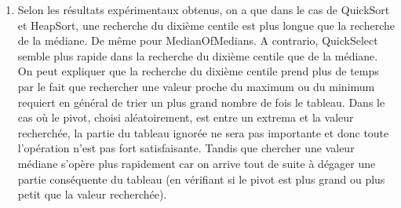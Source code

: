 \documentclass[a4paper, 11pt]{article}
\begin{document}
\begin{enumerate}
\begin{enumerate}
    \item
    \qquad Selon les résultats expérimentaux obtenus, on a que dans le cas de QuickSort et HeapSort, une recherche du dixième centile est plus longue que la recherche de la médiane. De même pour MedianOfMedians. A contrario, QuickSelect semble plus rapide dans la recherche du dixième centile que de la médiane. On peut expliquer que la recherche du dixième centile prend plus de temps par le fait que rechercher une valeur proche du maximum ou du minimum requiert en général de trier un plus grand nombre de fois le tableau. Dans le cas où le pivot, choisi aléatoirement, est entre un extrema et la valeur recherchée, la partie du tableau ignorée ne sera pas importante et donc toute l'opération n'est pas fort satisfaisante. Tandis que chercher une valeur médiane s'opère plus rapidement car on arrive tout de suite à dégager une partie conséquente du tableau (en vérifiant si le pivot est plus grand ou plus petit que la valeur recherchée). 
    
    
    \end{enumerate}
\end{enumerate}
\end{document}
